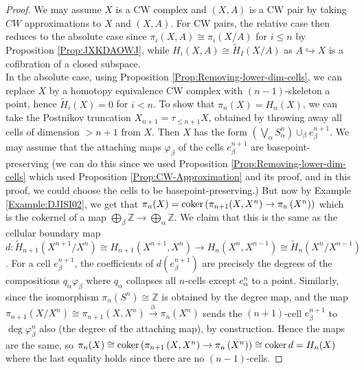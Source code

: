 \begin{proof}
    We may assume $X$ is a CW complex and $(X,A)$ is a CW
    pair by taking $CW$ approximations to $X$ and
    $\left( X,A \right) $. For
    CW pairs, the relative case then reduces
    to the absolute case since
    $\pi_i \left( X,A \right) \cong
    \pi_i (X / A)$ for $i\le n$ by
    Proposition \ref{Prop:JXKDAOWJ}, while
    $H_i(X,A) \cong \tilde{H}_I \left( X / A \right) $ 
    as $A \hookrightarrow X$ is a cofibration of
    a closed subspace.\\
    In the absolute case, using Proposition 
    \ref{Prop:Removing-lower-dim-cells}, we
    can replace $X$ by a homotopy equivalence
    CW complex with  $(n-1)$-skeleton a point, hence
    $\tilde{H}_i(X) = 0$ for
    $i < n$. To show that
    $\pi_n (X) = H_n(X)$, we can take the
    Postnikov truncation $X_{n+1} = \tau_{\le n+1} X$, obtained
    by throwing away all cells of dimension $> n+1$ from
    $X$. Then $X$ has the form
    $\left( \bigvee_{\alpha}S_{\alpha}^{n} \right) \cup_{\beta}
    e_{\beta}^{n+1}$. We may assume that the
    attaching maps $\varphi_{\beta}$ of the
    cells $e_{\beta}^{n+1}$ are basepoint-preserving (we
    can do this since we used Proposition 
    \ref{Prop:Removing-lower-dim-cells} which used
    Proposition \ref{Prop:CW-Approximation} and its
    proof, and in this proof, we could choose
    the cells to be basepoint-preserving.)
    But now by Example \ref{Example:DJISI02}, we get
    that 
    $\pi_n(X) = \operatorname{coker} \left( 
    \pi_{n+1}(X,X^{n}) \to 
\pi_n \left( X^{n} \right) \right) $ which is the cokernel
of a map $\bigoplus_{\beta} \mathbb{Z} \to 
\bigoplus_{\alpha} \mathbb{Z}$.
We claim that this is the
same as the cellular boundary map
$d \colon \tilde{H}_{n+1}\left( X^{n+1} / X^{n} \right) 
\cong H_{n+1}\left( X^{n+1}, X^{n} \right) \to 
H_{n}\left( X^{n}, X^{n-1} \right)\cong 
\tilde{H}_n \left( X^{n} / X^{n-1} \right) $.
For a cell $e_{\beta}^{n+1}$, the coefficients
of $d \left( e_{\beta}^{n+1} \right) $ are
precisely the degrees of the compositions
$q_{\alpha} \varphi_{\beta}$ where
$q_{\alpha}$ collapses all $n$-cells except
$e_{\alpha}^{n}$ to a point.
Similarly, since the isomorphism
$\pi_n \left( S^{n} \right) \cong \mathbb{Z}$ is
obtained by the degree map, and
the map $\pi_{n+1}\left( X / X^{n} \right) 
\cong \pi_{n+1}\left( X , X^{n} \right) \stackrel{\partial}{\to} 
\pi_n \left( X^{n} \right) $ sends
the $(n+1)$-cell $e_{\beta}^{n+1}$ to
$\deg \varphi_{\beta}^{n}$ also (the degree of the attaching
map), by construction. Hence the maps
are the same, so 
$\pi_n (X) \cong \operatorname{coker} \left( 
\pi_{n+1}\left( X,X^{n} \right) \to 
\pi_n \left( X^{n} \right) \right) \cong
\operatorname{coker} d = H_n (X)$ where the last equality holds since
there are no $(n-1)$-cells.


\end{proof}


